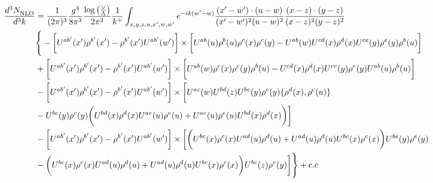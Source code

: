\documentclass[aps,prd,amsmath,amssymb,nofootinbib]{revtex4-2}
\numberwithin{equation}{section}
\begin{document}
\begin{align} \label{eq:4rho}
    \frac{d^{3}N_{\rm NLO}^{\rm}}{d^{3}k}  & = \frac{1}{(2\pi)^{3}}\frac{g^{4}}{8\pi^{3}}\frac{\log{\left(\frac{\vee}{\Lambda}\right)}}{2\pi^{2}} \frac{1}{k^{+}}\int_{x,y,z,u,x^{\prime},w,w^{\prime}}e^{-ik(w^{\prime}-w)}\frac{(x^{\prime}-w^{\prime})\cdot (u-w)}{(x^{\prime}-w^{\prime})^{2} (u-w)^{2}} \frac{(x-z)\cdot (y-z)}{(x-z)^{2}(y-z)^{2}}\notag \\ & \Bigg\{-\bigg[U^{ab^{\prime}}(x^{\prime})\rho^{b^{\prime}}(x^{\prime})-\rho^{b^{\prime}}(x^{\prime})U^{ab^{\prime}}(w^{\prime})\bigg]\times\bigg[U^{ab}(u)\rho^{b}(u)\rho^{c}(x)\rho^{c}(y)-U^{ab}(w)U^{cd}(x)\rho^{d}(x)U^{ce}(y)\rho^{e}(y)\rho^{b}(u)\bigg]\notag \\ & + \bigg[U^{ab^{\prime}}(x^{\prime})\rho^{b^{\prime}}(x^{\prime})-\rho^{b^{\prime}}(x^{\prime})U^{ab^{\prime}}(w^{\prime})\bigg]\times \bigg[U^{ab}(w)\rho^{c}(x)\rho^{c}(y)\rho^{b}(u)-U^{cd}(x)\rho^{d}(x)U^{ce}(y)\rho^{e}(y)U^{ab}(u)\rho^{b}(u)\bigg]\notag \\ & 
    -\bigg[U^{ab^{\prime}}(x^{\prime})\rho^{b^{\prime}}(x^{\prime})-\rho^{b^{\prime}}(x^{\prime})U^{ab^{\prime}}(w^{\prime})\bigg]\times \bigg[U^{ac}(w)U^{bd}(z)U^{be}(y)\rho^{e}(y)\{\rho^{d}(x),\rho^{c}(u)\}\notag \\ &-U^{bc}(y)\rho^{c}(y)\bigg(U^{bd}(x)\rho^{d}(x) U^{ae}(u)\rho^{e}(u)+U^{ae}(u)\rho^{e}(u)U^{bd}(x)\rho^{d}(x)\bigg)\bigg]\notag \\ & - \bigg[U^{ab^{\prime}}(x^{\prime})\rho^{b^{\prime}}(x^{\prime})-\rho^{b^{\prime}}(x^{\prime})U^{ab^{\prime}}(w^{\prime})\bigg]\times \bigg[\bigg(U^{bc}(x)\rho^{c}(x)U^{ad}(u)\rho^{d}(u)+U^{ad}(u)\rho^{d}(u)U^{bc}(x)\rho^{c}(x)\bigg)U^{be}(y)\rho^{e}(y)\notag \\ & -\bigg(U^{bc}(x)\rho^{c}(x)U^{ad}(u)\rho^{d}(u)+U^{ad}(u)\rho^{d}(u)U^{bc}(x)\rho^{c}(x)\bigg)U^{be}(z)\rho^{e}(y)\bigg]\Bigg\}+\rm{c.c} \notag \\ & 

\end{align}
\end{document}
